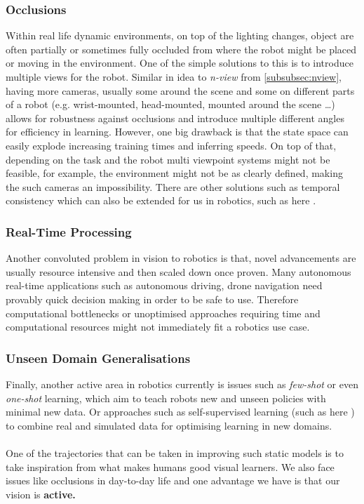     \subsubsection{Occlusions}
      Within real life dynamic environments, on top of the lighting changes, object are often partially or sometimes fully occluded from where the robot might be placed or moving in the environment. 
      One of the simple solutions to this is to introduce multiple views for the robot. Similar in idea to \emph{n-view} from \ref{subsubsec:nview}, having more cameras, usually some around the scene and some on different parts of a robot (e.g. wrist-mounted, head-mounted, mounted around the scene \ldots) allows for robustness against occlusions and introduce multiple different angles for efficiency in learning. 
      However, one big drawback is that the state space can easily explode increasing training times and inferring speeds. On top of that, depending on the task and the robot multi viewpoint systems might not be feasible, for example, the environment might not be as clearly defined, making the such cameras an impossibility. There are other solutions such as temporal consistency \cite{lai2018learningblindvideotemporal} which can also be extended for us in robotics, such as here \cite{billington2007using, yang2021reactive}.

    \subsubsection{Real-Time Processing}
    Another convoluted problem in vision to robotics is that, novel advancements are usually resource intensive and then scaled down once proven. Many autonomous real-time  applications such as autonomous driving, drone navigation need provably quick decision making in order to be safe to use. Therefore computational bottlenecks or unoptimised approaches requiring time and computational resources might not immediately fit a robotics use case.

    \subsubsection{Unseen Domain Generalisations}
    Finally, another active area in robotics currently is issues such as \emph{few-shot} or even \emph{one-shot} learning, which aim to teach robots new and unseen policies with minimal new data. Or approaches such as self-supervised learning (such as here \cite{lim2022real2sim2real, huang2021robot}) to combine real and simulated data for optimising learning in new domains.
    \\\\
    One of the trajectories that can be taken in improving such static models is to take inspiration from what makes humans good visual learners. We also face issues like occlusions in day-to-day life and one advantage we have is that our vision is \textbf{active.}
    
